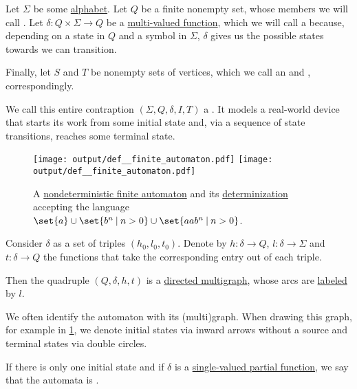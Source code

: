 \begin{definition}\label{def:finite_automaton}
  Let \( \Sigma \) be some \hyperref[def:formal_language]{alphabet}. Let \( Q \) be a finite nonempty set, whose members we will call . Let \( \delta: Q \times \Sigma \to Q \) be a \hyperref[def:multi_valued_function/total]{multi-valued function}, which we will call a  because, depending on a state in \( Q \) and a symbol in \( \Sigma \), \( \delta \) gives us the possible states towards we can transition.

  Finally, let \( S \) and \( T \) be nonempty sets of vertices, which we call an  and , correspondingly.

  We call this entire contraption \( (\Sigma, Q, \delta, I, T) \) a . It models a real-world device that starts its work from some initial state and, via a sequence of state transitions, reaches some terminal state.

  \begin{figure}[!ht]
    \hfill
    \texttt{[image: output/def\_\_finite\_automaton.pdf]}
    \hfill
    \texttt{[image: output/def\_\_finite\_automaton.pdf]}
    \hfill\hfill
    \caption{A \hyperref[def:finite_automaton/determinism]{nondeterministic finite automaton} and its \hyperref[alg:determinization_of_finite_automata]{determinization} accepting the language \( \set{ a } \cup \set{ b^n \given n > 0 } \cup \set{ aa b^n \given n > 0 } \).}
    \label{fig:def:finite_automaton}
  \end{figure}

  \begin{thmenum}
     Consider \( \delta \) as a set of triples \( (h_0, l_0, t_0) \). Denote by \( h: \delta \to Q \), \( l: \delta \to \Sigma \) and \( t: \delta \to Q \) the functions that take the corresponding entry out of each triple.

    Then the quadruple \( (Q, \delta, h, t) \) is a \hyperref[def:directed_multigraph]{directed multigraph}, whose arcs are \hyperref[def:labeled_set]{labeled} by \( l \).

    We often identify the automaton with its (multi)graph. When drawing this graph, for example in \cref{fig:def:finite_automaton}, we denote initial states via inward arrows without a source and terminal states via double circles.

     If there is only one initial state and if \( \delta \) is a \hyperref[def:partial_function]{single-valued partial function}, we say that the automata is .


\end{thmenum}
\end{definition}
